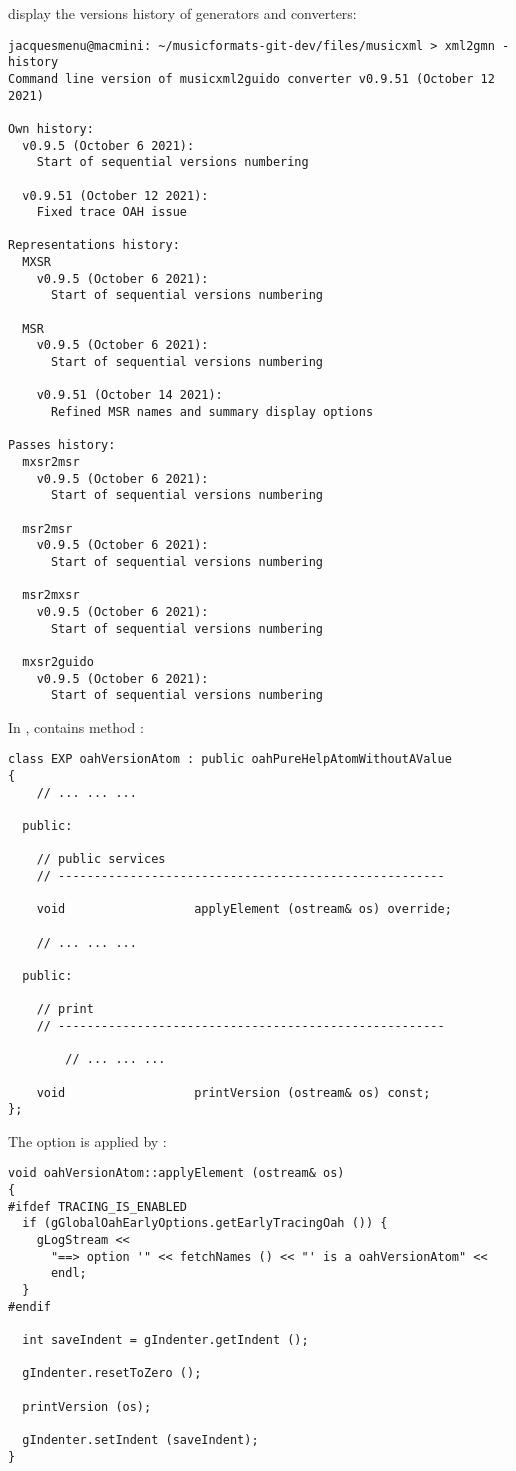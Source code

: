  display the versions history of generators and converters:
\begin{lstlisting}[language=Terminal]
jacquesmenu@macmini: ~/musicformats-git-dev/files/musicxml > xml2gmn -history
Command line version of musicxml2guido converter v0.9.51 (October 12 2021)

Own history:
  v0.9.5 (October 6 2021):
    Start of sequential versions numbering

  v0.9.51 (October 12 2021):
    Fixed trace OAH issue

Representations history:
  MXSR
    v0.9.5 (October 6 2021):
      Start of sequential versions numbering

  MSR
    v0.9.5 (October 6 2021):
      Start of sequential versions numbering

    v0.9.51 (October 14 2021):
      Refined MSR names and summary display options

Passes history:
  mxsr2msr
    v0.9.5 (October 6 2021):
      Start of sequential versions numbering

  msr2msr
    v0.9.5 (October 6 2021):
      Start of sequential versions numbering

  msr2mxsr
    v0.9.5 (October 6 2021):
      Start of sequential versions numbering

  mxsr2guido
    v0.9.5 (October 6 2021):
      Start of sequential versions numbering
\end{lstlisting}


In ,  contains method :
\begin{lstlisting}[language=CPlusPlus]
class EXP oahVersionAtom : public oahPureHelpAtomWithoutAValue
{
	// ... ... ...

  public:

    // public services
    // ------------------------------------------------------

    void                  applyElement (ostream& os) override;

	// ... ... ...

  public:

    // print
    // ------------------------------------------------------

		// ... ... ...

    void                  printVersion (ostream& os) const;
};
\end{lstlisting}

The option is applied by :
\begin{lstlisting}[language=CPlusPlus]
void oahVersionAtom::applyElement (ostream& os)
{
#ifdef TRACING_IS_ENABLED
  if (gGlobalOahEarlyOptions.getEarlyTracingOah ()) {
    gLogStream <<
      "==> option '" << fetchNames () << "' is a oahVersionAtom" <<
      endl;
  }
#endif

  int saveIndent = gIndenter.getIndent ();

  gIndenter.resetToZero ();

  printVersion (os);

  gIndenter.setIndent (saveIndent);
}
\end{lstlisting}

